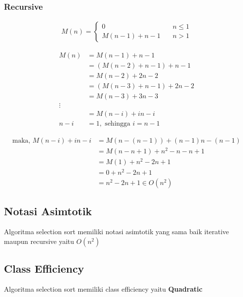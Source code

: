 \documentclass[12pt]{article}
\begin{document}
\subsubsection{Recursive}
\begin{align}
    M(n) =
    \begin{cases}
        0 & \quad n \leq 1\\
        M(n-1) + n - 1  & \quad n > 1
    \end{cases}
\end{align}
    
\begin{align}
    M(n) &=M(n-1) + n -1
    \nonumber
    \\
    &= (M(n-2) + n -1) + n - 1
    \nonumber
    \\
    &= M(n-2) + 2n - 2
    \nonumber
    \\
    &= (M(n-3) + n-1) + 2n - 2
    \nonumber
    \\
    &= M(n-3) + 3n - 3
    \nonumber
    \\ \vdots
    \nonumber
    \\
    &= M(n-i) + in-i
    \nonumber
    \\
    n-i &= 1, \text{ sehingga } i = n - 1
\end{align}

\begin{align}
    \text{maka, }M(n-i) + in - i &= M(n-(n-1)) + (n-1)n - (n-1)
    \nonumber
    \\
    &= M(n-n+1) + n^2 - n - n + 1
    \nonumber
    \\
    &= M(1) + n^2 - 2n+1
    \nonumber
    \\
    &= 0 + n^2 - 2n + 1
    \nonumber
    \\
    &= n^2 - 2n + 1 \in O(n^2)
\end{align}
\subsection{Notasi Asimtotik}
Algoritma selection sort memiliki notasi asimtotik yang sama baik iterative maupun recursive yaitu $O(n^2)$
\subsection{Class Efficiency}
Algoritma selection sort memiliki class efficiency yaitu \textbf{Quadratic}
\newpage
\end{document}
